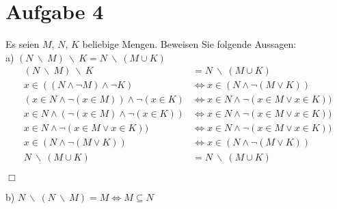\section*{Aufgabe 4}

Es seien $M$, $N$, $K$ beliebige Mengen. Beweisen Sie folgende Aussagen:\\

a) $(N \ \backslash \ M) \ \backslash \ K = N \ \backslash \ (M \cup K)$\\

\begin{align*}
(N \ \backslash \ M) \ \backslash \ K &= N \ \backslash \ (M \cup K)\\
x \in ((N \land \lnot M) \land \lnot K) &\Leftrightarrow x \in (N \land \lnot (M \lor K))\\
(x \in N \land \lnot (x \in M)) \land \lnot (x \in K) &\Leftrightarrow x \in N \land \lnot (x \in M \lor x \in K))\\
x \in N \land (\lnot (x \in M) \land \lnot (x \in K)) &\Leftrightarrow x \in N \land \lnot (x \in M \lor x \in K))\\
x \in N \land \lnot (x \in M \lor x \in K)) &\Leftrightarrow x \in N \land \lnot (x \in M \lor x \in K))\\
x \in (N \land \lnot (M \lor K)) &\Leftrightarrow x \in (N \land \lnot (M \lor K))\\
N \ \backslash \ (M \cup K) &= N \ \backslash \ (M \cup K)
\end{align*}
\begin{FlushRight}
$\Box$
\end{FlushRight}

b) $N \ \backslash \ (N \ \backslash \ M) = M \Leftrightarrow M \subseteq N$\\
